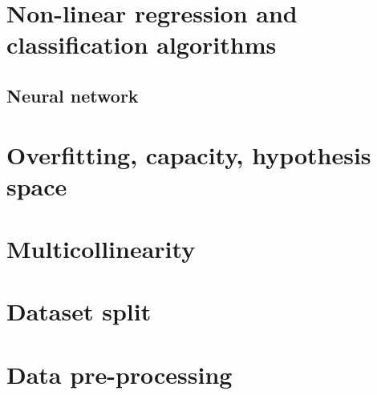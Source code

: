 \section{Non-linear regression and classification algorithms}
\subsection{Neural network}

\section{Overfitting, capacity, hypothesis space}
\section{Multicollinearity}
\section{Dataset split} \label{sec:datasetsplit}


	
	
\section{Data pre-processing}



